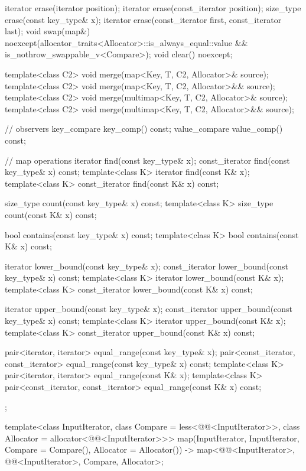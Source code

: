 \begin{codeblock}
{{    iterator  erase(iterator position);
    iterator  erase(const_iterator position);
    size_type erase(const key_type& x);
    iterator  erase(const_iterator first, const_iterator last);
    void      swap(map&)
      noexcept(allocator_traits<Allocator>::is_always_equal::value &&
               is_nothrow_swappable_v<Compare>);
    void      clear() noexcept;

    template<class C2>
      void merge(map<Key, T, C2, Allocator>& source);
    template<class C2>
      void merge(map<Key, T, C2, Allocator>&& source);
    template<class C2>
      void merge(multimap<Key, T, C2, Allocator>& source);
    template<class C2>
      void merge(multimap<Key, T, C2, Allocator>&& source);

    // observers
    key_compare key_comp() const;
    value_compare value_comp() const;

    // map operations
    iterator       find(const key_type& x);
    const_iterator find(const key_type& x) const;
    template<class K> iterator       find(const K& x);
    template<class K> const_iterator find(const K& x) const;

    size_type      count(const key_type& x) const;
    template<class K> size_type count(const K& x) const;

    bool           contains(const key_type& x) const;
    template<class K> bool contains(const K& x) const;

    iterator       lower_bound(const key_type& x);
    const_iterator lower_bound(const key_type& x) const;
    template<class K> iterator       lower_bound(const K& x);
    template<class K> const_iterator lower_bound(const K& x) const;

    iterator       upper_bound(const key_type& x);
    const_iterator upper_bound(const key_type& x) const;
    template<class K> iterator       upper_bound(const K& x);
    template<class K> const_iterator upper_bound(const K& x) const;

    pair<iterator, iterator>               equal_range(const key_type& x);
    pair<const_iterator, const_iterator>   equal_range(const key_type& x) const;
    template<class K>
      pair<iterator, iterator>             equal_range(const K& x);
    template<class K>
      pair<const_iterator, const_iterator> equal_range(const K& x) const;
  };

  template<class InputIterator, class Compare = less<@@<InputIterator>>,
           class Allocator = allocator<@@<InputIterator>>>
    map(InputIterator, InputIterator, Compare = Compare(), Allocator = Allocator())
      -> map<@@<InputIterator>, @@<InputIterator>, Compare, Allocator>;

}
\end{codeblock}
